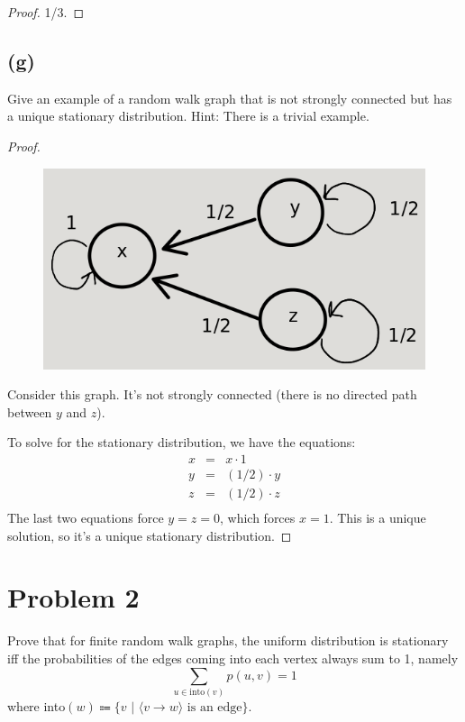 \documentclass[14pt]{extarticle}
\begin{document}
\begin{proof}
1/3.
\end{proof}

\subsection{(g)}
Give an example of a random walk graph that is not strongly connected but has a unique stationary distribution. Hint: There is a trivial example.

\begin{proof}
\begin{figure}[ht!]
\centering
\includegraphics[scale=0.4]{stationary.png}
\end{figure}
Consider this graph. It's not strongly connected (there is no directed path between $y$ and $z$).

To solve for the stationary distribution, we have the equations:
$$
\begin{array}{ccc}
x&=&x \cdot 1\\
y&=&(1/2)\cdot y\\
z&=&(1/2)\cdot z\\
\end{array}
$$
The last two equations force $y = z = 0$, which forces $x = 1$. This is a unique solution, so it's a unique stationary distribution.
\end{proof}

\section{Problem 2}
Prove that for finite random walk graphs, the uniform distribution is stationary iff the probabilities of the edges coming into each vertex always sum to 1, namely
$$
\sum_{u \in \text{into}(v)} p(u,v) = 1
$$
where into$(w) \Coloneqq \{v\,\, | \,\,\langle v \to w\rangle \text{ is an edge}\}$.
\end{document}
